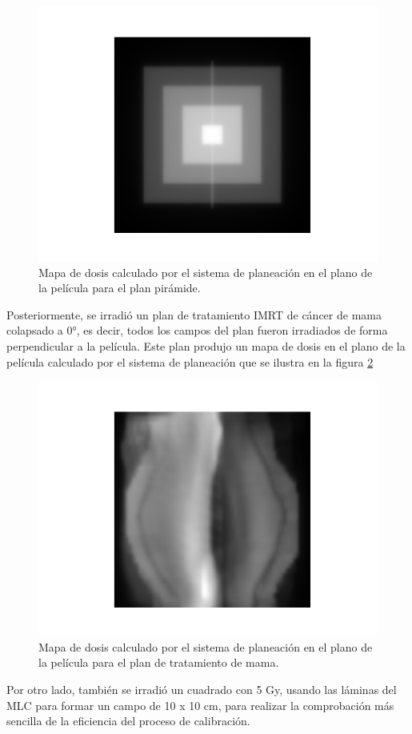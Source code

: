 \begin{figure}
	\centering
	\includegraphics[width=0.7\linewidth]{images/piramideTPS.png}
	\caption{Mapa de dosis calculado por el sistema de planeación en el plano de la película para el plan pirámide.}
	\label{fig:TPSPiramide}
\end{figure}

Posteriormente, se irradió un plan de tratamiento IMRT de cáncer de mama colapsado a 0°, es decir, todos los campos del plan fueron irradiados de forma perpendicular a la película. Este plan produjo un mapa de dosis en el plano de la película calculado por el sistema de planeación que se ilustra en la figura \ref{fig:TPSMama}\\

\begin{figure}
	\centering
	\includegraphics[width=0.7\linewidth]{images/mamaTPS.png}
	\caption{Mapa de dosis calculado por el sistema de planeación en el plano de la película para el plan de tratamiento de mama.}
	\label{fig:TPSMama}
\end{figure}

Por otro lado, también se irradió un cuadrado con 5 Gy, usando las láminas del MLC para formar un campo de 10 x 10 cm, para realizar la comprobación más sencilla de la eficiencia del proceso de calibración.\\

